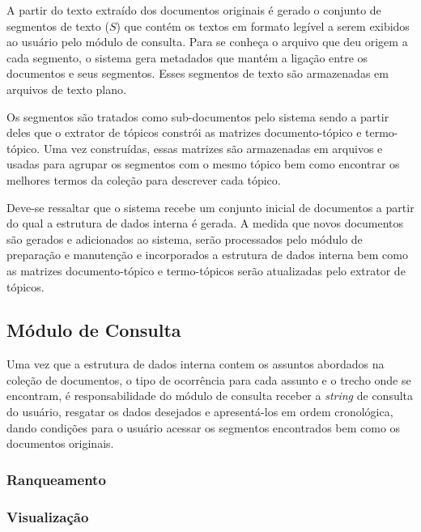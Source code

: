 A partir do texto extraído dos documentos originais é gerado o conjunto de segmentos de texto ($S$) que contém os textos em formato legível a serem exibidos ao usuário pelo módulo de consulta. Para se conheça o arquivo que deu origem a cada segmento, o sistema gera metadados que mantém a ligação entre os documentos e seus segmentos. Esses segmentos de texto são armazenadas em arquivos de texto plano. 

Os segmentos são tratados como sub-documentos pelo sistema sendo a partir deles que o extrator de tópicos constrói as matrizes documento-tópico e termo-tópico. Uma vez construídas, essas matrizes são armazenadas em arquivos e usadas para agrupar os segmentos com o mesmo tópico bem como encontrar os melhores termos da coleção para descrever cada tópico.

Deve-se ressaltar que o sistema recebe um conjunto inicial de documentos a partir do qual a estrutura de dados interna é gerada. A medida que novos documentos são gerados e adicionados ao sistema, serão processados pelo módulo de preparação e manutenção e incorporados a estrutura de dados interna bem como as matrizes documento-tópico e termo-tópicos serão atualizadas pelo extrator de tópicos.





\subsection{Módulo de Consulta}


Uma vez que a estrutura de dados interna contem os assuntos abordados na coleção de documentos, o tipo de ocorrência para cada assunto e o trecho onde se encontram, 
é responsabilidade do módulo de consulta receber a \textit{string} de consulta do usuário, resgatar os dados desejados e apresentá-los em ordem cronológica, dando condições para o usuário acessar os segmentos encontrados bem como os documentos originais.


\subsubsection{Ranqueamento}

\subsubsection{Visualização}


